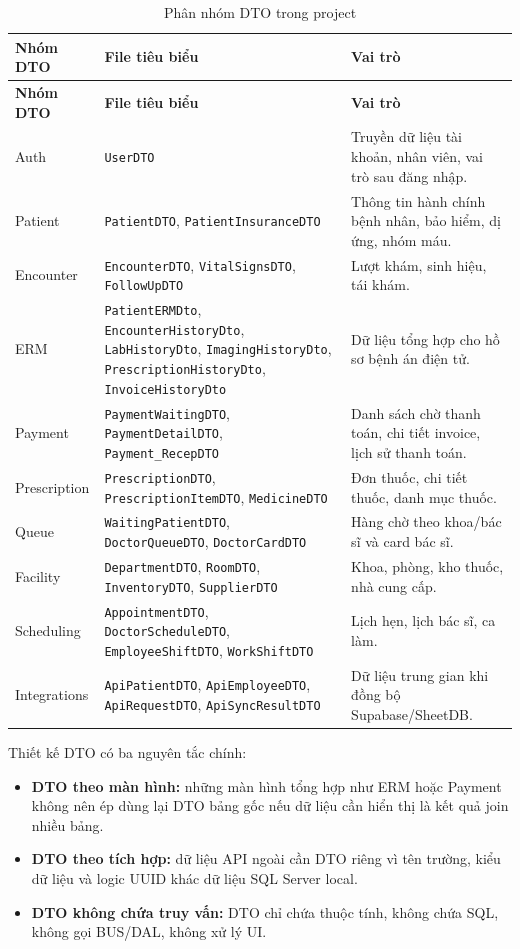 \documentclass[12pt,a4paper]{article}
\numberwithin{figure}{subsection}
\numberwithin{table}{subsection}
\begin{document}
\begin{longtable}{|p{3.8cm}|p{4.8cm}|p{5.2cm}|}
\caption{Phân nhóm DTO trong project} \\
\hline
\textbf{Nhóm DTO} & \textbf{File tiêu biểu} & \textbf{Vai trò} \\
\hline
\endfirsthead
\hline
\textbf{Nhóm DTO} & \textbf{File tiêu biểu} & \textbf{Vai trò} \\
\hline
\endhead
Auth & \texttt{UserDTO} & Truyền dữ liệu tài khoản, nhân viên, vai trò sau đăng nhập. \\
\hline
Patient & \texttt{PatientDTO}, \texttt{PatientInsuranceDTO} & Thông tin hành chính bệnh nhân, bảo hiểm, dị ứng, nhóm máu. \\
\hline
Encounter & \texttt{EncounterDTO}, \texttt{VitalSignsDTO}, \texttt{FollowUpDTO} & Lượt khám, sinh hiệu, tái khám. \\
\hline
ERM & \texttt{PatientERMDto}, \texttt{EncounterHistoryDto}, \texttt{LabHistoryDto}, \texttt{ImagingHistoryDto}, \texttt{PrescriptionHistoryDto}, \texttt{InvoiceHistoryDto} & Dữ liệu tổng hợp cho hồ sơ bệnh án điện tử. \\
\hline
Payment & \texttt{PaymentWaitingDTO}, \texttt{PaymentDetailDTO}, \texttt{Payment\_RecepDTO} & Danh sách chờ thanh toán, chi tiết invoice, lịch sử thanh toán. \\
\hline
Prescription & \texttt{PrescriptionDTO}, \texttt{PrescriptionItemDTO}, \texttt{MedicineDTO} & Đơn thuốc, chi tiết thuốc, danh mục thuốc. \\
\hline
Queue & \texttt{WaitingPatientDTO}, \texttt{DoctorQueueDTO}, \texttt{DoctorCardDTO} & Hàng chờ theo khoa/bác sĩ và card bác sĩ. \\
\hline
Facility & \texttt{DepartmentDTO}, \texttt{RoomDTO}, \texttt{InventoryDTO}, \texttt{SupplierDTO} & Khoa, phòng, kho thuốc, nhà cung cấp. \\
\hline
Scheduling & \texttt{AppointmentDTO}, \texttt{DoctorScheduleDTO}, \texttt{EmployeeShiftDTO}, \texttt{WorkShiftDTO} & Lịch hẹn, lịch bác sĩ, ca làm. \\
\hline
Integrations & \texttt{ApiPatientDTO}, \texttt{ApiEmployeeDTO}, \texttt{ApiRequestDTO}, \texttt{ApiSyncResultDTO} & Dữ liệu trung gian khi đồng bộ Supabase/SheetDB. \\
\hline
\end{longtable}

Thiết kế DTO có ba nguyên tắc chính:

\begin{itemize}
    \item \textbf{DTO theo màn hình:} những màn hình tổng hợp như ERM hoặc Payment không nên ép dùng lại DTO bảng gốc nếu dữ liệu cần hiển thị là kết quả join nhiều bảng.
    \item \textbf{DTO theo tích hợp:} dữ liệu API ngoài cần DTO riêng vì tên trường, kiểu dữ liệu và logic UUID khác dữ liệu SQL Server local.
    \item \textbf{DTO không chứa truy vấn:} DTO chỉ chứa thuộc tính, không chứa SQL, không gọi BUS/DAL, không xử lý UI.
\end{itemize}
\end{document}
